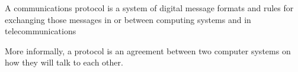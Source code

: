 
    A communications protocol is a system of digital message formats and rules for exchanging those messages in or between computing systems and in telecommunications

More informally, a protocol is an agreement between two computer systems on how they will talk to each other.




